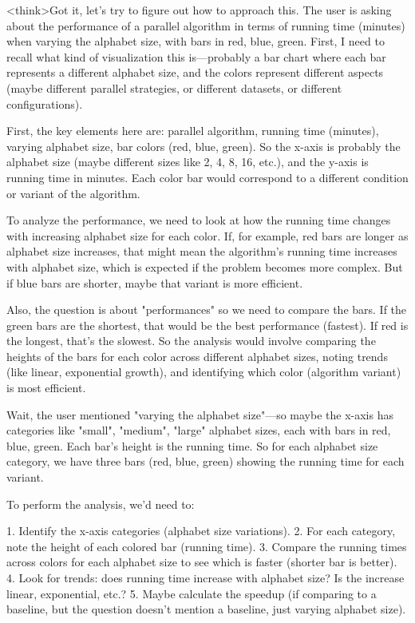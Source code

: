 <think>Got it, let's try to figure out how to approach this. The user is asking about the performance of a parallel algorithm in terms of running time (minutes) when varying the alphabet size, with bars in red, blue, green. First, I need to recall what kind of visualization this is—probably a bar chart where each bar represents a different alphabet size, and the colors represent different aspects (maybe different parallel strategies, or different datasets, or different configurations). 

First, the key elements here are: parallel algorithm, running time (minutes), varying alphabet size, bar colors (red, blue, green). So the x-axis is probably the alphabet size (maybe different sizes like 2, 4, 8, 16, etc.), and the y-axis is running time in minutes. Each color bar would correspond to a different condition or variant of the algorithm. 

To analyze the performance, we need to look at how the running time changes with increasing alphabet size for each color. If, for example, red bars are longer as alphabet size increases, that might mean the algorithm's running time increases with alphabet size, which is expected if the problem becomes more complex. But if blue bars are shorter, maybe that variant is more efficient. 

Also, the question is about "performances" so we need to compare the bars. If the green bars are the shortest, that would be the best performance (fastest). If red is the longest, that's the slowest. So the analysis would involve comparing the heights of the bars for each color across different alphabet sizes, noting trends (like linear, exponential growth), and identifying which color (algorithm variant) is most efficient. 

Wait, the user mentioned "varying the alphabet size"—so maybe the x-axis has categories like "small", "medium", "large" alphabet sizes, each with bars in red, blue, green. Each bar's height is the running time. So for each alphabet size category, we have three bars (red, blue, green) showing the running time for each variant. 

To perform the analysis, we'd need to:

1. Identify the x-axis categories (alphabet size variations).
2. For each category, note the height of each colored bar (running time).
3. Compare the running times across colors for each alphabet size to see which is faster (shorter bar is better).
4. Look for trends: does running time increase with alphabet size? Is the increase linear, exponential, etc.?
5. Maybe calculate the speedup (if comparing to a baseline, but the question doesn't mention a baseline, just varying alphabet size).

